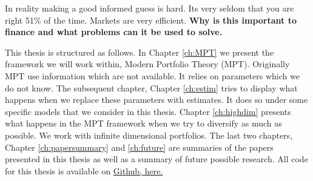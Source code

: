 In reality making a good informed guess is hard.
Its very seldom that you are right 51\% of the time.
Markets are very efficient.
\textbf{Why is this important to finance and what problems can it be used to solve.}

This thesis is structured as follows. 
In Chapter \ref{ch:MPT} we present the framework we will work within, \citet{markowitz1959portfolio} Modern Portfolio Theory (MPT). 
Originally MPT use information which are not available. 
It relies on parameters which we do not know. 
The subsequent chapter, Chapter \ref{ch:estim} tries to display what happens when we replace these parameters with estimates.
It does so under some specific models that we consider in this thesis.
Chapter \ref{ch:highdim} presents what happens in the MPT framework when we try to diversify as much as possible.
We work with infinite dimensional portfolios.
The last two chapters, Chapter \ref{ch:papersummary} and \ref{ch:future} are summaries of the papers presented in this thesis as well as a summary of future possible research.
All code for this thesis is available on \href{https://github.com/Ethorsn/Phd-thesis}{Github, here.}
